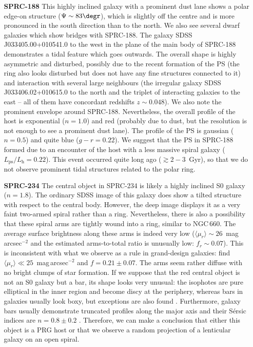 \documentclass{raa}
\begin{document}
{\bf SPRC-188}
This highly inclined galaxy with a prominent dust lane shows a polar edge-on structure ($\Psi\sim83\degr$), which is slightly off the centre and is more pronounced in the south direction than to the north. We also see several dwarf galaxies which show bridges with SPRC-188. The galaxy SDSS\,J033405.00+010541.0 to the west in the plane of the main body of SPRC-188 demonstrates a tidal feature which goes outwards. The overall shape is highly asymmetric and disturbed, possibly due to the recent formation of the PS (the ring also looks disturbed but does not have any fine structures connected to it) and interaction with several large neighbours (the irregular galaxy SDSS\,J033406.02+010615.0 to the north and the triplet of interacting galaxies to the east -- all of them have concordant redshifts $z\sim0.048$). We also note the prominent envelope around SPRC-188. Nevertheless, the overall profile of the host is exponential ($n=1.0$) and red (probably due to dust, but the resolution is not enough to see a prominent dust lane). The profile of the PS is gaussian ($n=0.5$) and quite blue ($g-r=0.22$). We suggest that the PS in SPRC-188 formed due to an encounter of the host with a less massive spiral galaxy ($L_\mathrm{ps}/L_\mathrm{h}=0.22$). This event occurred quite long ago ($\gtrsim2-3$~Gyr), so that we do not observe prominent tidal structures related to the polar ring.


{\bf SPRC-234}
The central object in SPRC-234 is likely a highly inclined S0 galaxy ($n=1.8$). The ordinary SDSS image of this galaxy does show a tilted structure with respect to the central body. However, the deep image displays it as a very faint two-armed spiral rather than a ring. Nevertheless, there is also a possibility that these spiral arms are tightly wound into a ring, similar to NGC\,660. The average surface brightness along these arms is indeed very low ($\langle \mu_{r} \rangle \sim26$~mag\,arcsec$^{-2}$ and the estimated arms-to-total ratio is unusually low: $f_{r}\sim0.07$). This is inconsistent with what we observe as a rule in grand-design galaxies: \citet{2020MNRAS.493..390S} find $\langle \mu_{r} \rangle \ll 25$~mag\,arcsec$^{-2}$ and $f=0.21\pm0.07$. The arms seem rather diffuse with no bright clumps of star formation. If we suppose that the red central object is not an S0 galaxy but a bar, its shape looks very unusual: the isophotes are pure elliptical in the inner region and become discy at the periphery, whereas bars in galaxies usually look boxy, but exceptions are also found \citep[see e.g.][and references therein]{2020arXiv200709090S}. Furthermore, galaxy bars usually demonstrate truncated profiles along the major axis and their S\'ersic indices are $n=0.8\pm0.2$ \citep{2009MNRAS.393.1531G}. Therefore, we can make a conclusion that either this object is a PRG host or that we observe a random projection of a lenticular galaxy on an open spiral. 
\end{document}
